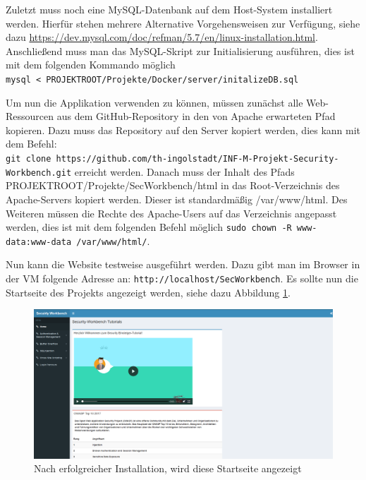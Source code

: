 Zuletzt muss noch eine MySQL-Datenbank auf dem Host-System installiert werden. Hierfür stehen mehrere Alternative Vorgehensweisen zur Verfügung, siehe dazu \url{https://dev.mysql.com/doc/refman/5.7/en/linux-installation.html}. Anschließend muss man das MySQL-Skript zur Initialisierung ausführen, dies ist mit dem folgenden Kommando möglich\\ \colorbox{altgray}{\lstinline|mysql < PROJEKTROOT/Projekte/Docker/server/initalizeDB.sql|} \medskip

Um nun die Applikation verwenden zu können, müssen zunächst alle Web-Ressourcen aus dem GitHub-Repository in den von Apache erwarteten Pfad kopieren. Dazu muss das Repository auf den Server kopiert werden, dies kann mit dem Befehl:\\ \colorbox{altgray}{\lstinline|git clone https://github.com/th-ingolstadt/INF-M-Projekt-Security-Workbench.git|} erreicht werden. Danach muss der Inhalt des Pfads PROJEKTROOT/Projekte/SecWorkbench/html in das Root-Verzeichnis des Apache-Servers kopiert werden. Dieser ist standardmäßig /var/www/html. Des Weiteren müssen die Rechte des Apache-Users auf das Verzeichnis angepasst werden, dies ist mit dem folgenden Befehl möglich \colorbox{altgray}{\lstinline|sudo chown -R www-data:www-data /var/www/html/|}.\medskip

Nun kann die Website testweise ausgeführt werden. Dazu gibt man im Browser in der VM folgende Adresse an:  \colorbox{altgray}{\lstinline|http://localhost/SecWorkbench|}. Es sollte nun die Startseite des Projekts angezeigt werden, siehe dazu Abbildung \ref{fig:startseite}.

\begin{figure}[H]
	\centering
	\includegraphics[width=\textwidth]{images/Installation/startseite.png}
	\caption{Nach erfolgreicher Installation, wird diese Startseite angezeigt}
	\label{fig:startseite}
\end{figure}

